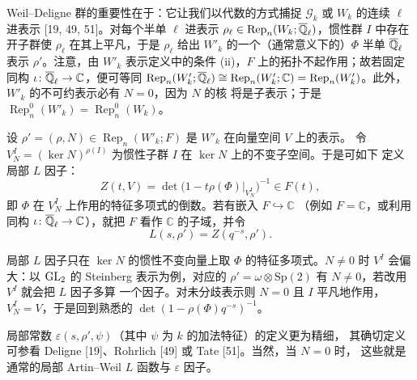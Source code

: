 Weil--Deligne 群的重要性在于：它让我们以代数的方式捕捉 $\mathcal{G}_k$ 或 $W_k$
的连续 $\ell$ 进表示 [19, 49, 51]。对每个半单 $\ell$ 进表示
$\rho_\ell\in\operatorname{Rep}_n(W_k;\overline{\mathbb{Q}}_\ell)$，惯性群 $I$ 中存在开子群使 $\rho_\ell$
在其上平凡，于是 $\rho_\ell$ 给出 $W'_k$ 的一个（通常意义下的）$\Phi$ 半单 $\overline{\mathbb{Q}}_\ell$ 表示
$\rho'$。注意，由 $W'_k$ 表示定义中的条件 (ii)，$F$ 上的拓扑不起作用；故若固定同构
$\iota\colon\overline{\mathbb{Q}}_\ell\to\mathbb{C}$，便可等同
$\operatorname{Rep}_n(W'_k;\overline{\mathbb{Q}}_\ell)\cong\operatorname{Rep}_n(W'_k;\mathbb{C})
=\operatorname{Rep}_n(W'_k)$。此外，$W'_k$ 的不可约表示必有 $N=0$，因为 $N$ 的核
将是子表示；于是 $\operatorname{Rep}_n^0(W'_k)=\operatorname{Rep}_n^0(W_k)$。

设 $\rho'=(\rho,N)\in\operatorname{Rep}_n(W'_k;F)$ 是 $W'_k$ 在向量空间 $V$ 上的表示。
令 $V_N^I=(\ker N)^{\rho(I)}$ 为惯性子群 $I$ 在 $\ker N$ 上的不变子空间。于是可如下
定义局部 $L$ 因子：
\[
  Z(t,V)=\det\bigl(1-t\rho(\Phi)|_{V_N^I}\bigr)^{-1}\in F(t),
\]
即 $\Phi$ 在 $V_N^I$ 上作用的特征多项式的倒数。若有嵌入 $F\hookrightarrow\mathbb{C}$
（例如 $F=\mathbb{C}$，或利用同构 $\iota\colon\overline{\mathbb{Q}}_\ell\to\mathbb{C}$），就把 $F$ 看作
$\mathbb{C}$ 的子域，并令
\[
  L(s,\rho')=Z(q^{-s},\rho').
\]
\begin{annote}
局部 $L$ 因子只在 $\ker N$ 的惯性不变向量上取 $\Phi$ 的特征多项式。$N\neq0$ 时
$V^I$ 会偏大：以 $\mathrm{GL}_2$ 的 Steinberg 表示为例，对应的
$\rho'=\omega\otimes\mathrm{Sp}(2)$ 有 $N\neq0$，若改用 $V^I$ 就会把 $L$ 因子多算
一个因子。对未分歧表示则 $N=0$ 且 $I$ 平凡地作用，$V_N^I=V$，于是回到熟悉的
$\det(1-\rho(\Phi)q^{-s})^{-1}$。
\par{}
\end{annote}

局部常数 $\varepsilon(s,\rho',\psi)$（其中 $\psi$ 为 $k$ 的加法特征）的定义更为精细，
其确切定义可参看 Deligne [19]、Rohrlich [49] 或 Tate [51]。当然，当 $N=0$ 时，
这些就是通常的局部 Artin--Weil $L$ 函数与 $\varepsilon$ 因子。

